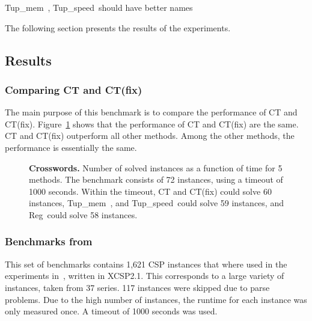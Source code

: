 \documentclass[a4paper,11pt]{article}
\newcommand{\Todo}[1]{{\color{blue}#1}}
\newcommand{\Reg}[0]{Reg~}
\newcommand{\Tups}[0]{Tup\_speed~}
\newcommand{\Tupm}[0]{Tup\_mem~}
\newcommand{\CTpaper}[0]{DBLP:conf/cp/DemeulenaereHLP16}
\numberwithin{equation}{section}
\begin{document}
\Todo{\Tupm, \Tups should have better names}

The following section presents the results of the experiments.

\subsection{Results}
\label{evaluation:results}

\subsubsection{Comparing CT and CT(fix)}

The main purpose of this benchmark is to compare the performance of CT and CT(fix).
Figure~\ref{fig:fix} shows that the performance of CT and CT(fix) are the same.
CT and CT(fix) outperform all other methods. Among the
other methods, the performance is essentially the same.

\begin{figure}[H]
  \label{fig:fix}
  \centering
    
\caption{\textbf{Crosswords.} Number of solved instances as a function of time
  for 5 methods.
  The benchmark consists of 72 instances, using a timeout
  of 1000 seconds. Within the timeout,
  CT and CT(fix) could solve 60 instances, \Tupm, and \Tups could
  solve 59 instances, and \Reg could solve 58 instances.}
\end{figure}



\subsubsection{Benchmarks from \cite{\CTpaper}}


This set of benchmarks contains 1,621 CSP instances that where used in the
experiments in~\cite{\CTpaper}, written in XCSP2.1.
This corresponds to a large variety of instances,
taken from 37 series. 117 instances were skipped due to parse problems.
Due to the high number of instances, the runtime for
each instance was only measured once. A timeout of 1000 seconds was used.
\end{document}
